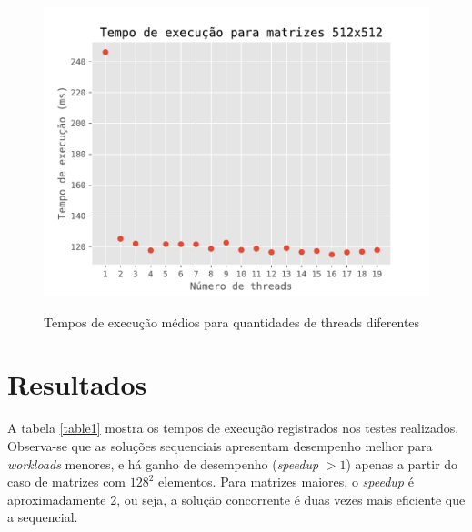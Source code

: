\documentclass[12pt, a4paper]{article}
\begin{document}
\begin{figure}[!h]
\centering
\includegraphics[width=.7\textwidth]{512_20threads}
\label{fig:f2}
\caption{Tempos de execução médios para quantidades de threads diferentes}
\end{figure}

\section{Resultados}
A tabela \ref{table1} mostra os tempos de execução registrados nos testes
realizados.  Observa-se que as soluções sequenciais apresentam desempenho
melhor para \emph{workloads} menores, e há ganho de desempenho (\emph{speedup}
$ > 1 $) apenas a partir do caso de matrizes com $ 128^2 $ elementos. Para
matrizes maiores, o \emph{speedup} é aproximadamente 2, ou seja, a solução
concorrente é duas vezes mais eficiente que a sequencial.
\end{document}
